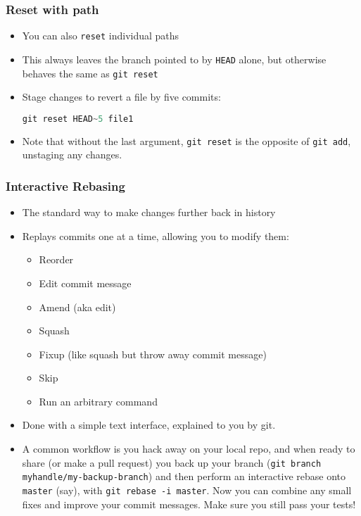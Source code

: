 \documentclass{beamer}
\begin{document}
\begin{frame}[fragile]
\frametitle{Reset with path}
\begin{itemize}
\item You can also \lstinline{reset} individual paths
\item This always leaves the branch pointed to by \texttt{HEAD} alone, but otherwise behaves the same as \lstinline{git reset}
\item Stage changes to revert a file by five commits:
\begin{lstlisting}[language=C++]
git reset HEAD~5 file1
\end{lstlisting}
\item Note that without the last argument, \lstinline{git reset} is the opposite of \lstinline{git add}, unstaging any changes.
\end{itemize}
\end{frame}

\begin{frame}[fragile]
\frametitle{Interactive Rebasing}
\begin{itemize}
\item The standard way to make changes further back in history
\item Replays commits one at a time, allowing you to modify them:
\begin{itemize}
\item Reorder
\item Edit commit message
\item Amend (aka edit)
\item Squash
\item Fixup (like squash but throw away commit message)
\item Skip
\item Run an arbitrary command
\end{itemize}
\item Done with a simple text interface, explained to you by git.
\item A common workflow is you hack away on your local repo, and when ready to share (or make a pull request) you back up your branch (\lstinline{git branch myhandle/my-backup-branch}) and then perform an interactive rebase onto \lstinline{master} (say), with \lstinline{git rebase -i master}. Now you can combine any small fixes and improve your commit messages. Make sure you still pass your tests!
\end{itemize}
\end{frame}
\end{document}
